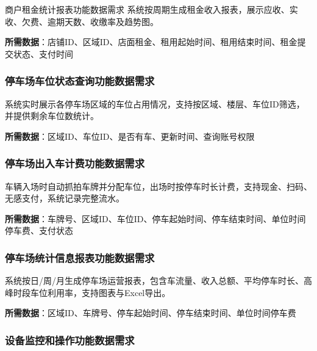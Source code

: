 \documentclass[]{article}
\begin{document}
商户租金统计报表功能数据需求
系统按周期生成租金收入报表，展示应收、实收、欠费、逾期天数、收缴率及趋势图。

\textbf{所需数据}：店铺ID、区域ID、店面租金、租用起始时间、租用结束时间、租金提交状态、支付时间

\hypertarget{ux505cux8f66ux573aux8f66ux4f4dux72b6ux6001ux67e5ux8be2ux529fux80fdux6570ux636eux9700ux6c42}{%
  \subsubsection{停车场车位状态查询功能数据需求}\label{ux505cux8f66ux573aux8f66ux4f4dux72b6ux6001ux67e5ux8be2ux529fux80fdux6570ux636eux9700ux6c42}}

系统实时展示各停车场区域的车位占用情况，支持按区域、楼层、车位ID筛选，并提供剩余车位数统计。

\textbf{所需数据}：区域ID、车位ID、是否有车、更新时间、查询账号权限

\hypertarget{ux505cux8f66ux573aux51faux5165ux8f66ux8ba1ux8d39ux529fux80fdux6570ux636eux9700ux6c42}{%
  \subsubsection{停车场出入车计费功能数据需求}\label{ux505cux8f66ux573aux51faux5165ux8f66ux8ba1ux8d39ux529fux80fdux6570ux636eux9700ux6c42}}

车辆入场时自动抓拍车牌并分配车位，出场时按停车时长计费，支持现金、扫码、无感支付，系统记录完整流水。

\textbf{所需数据}：车牌号、区域ID、车位ID、停车起始时间、停车结束时间、单位时间停车费、支付状态

\hypertarget{ux505cux8f66ux573aux7edfux8ba1ux4fe1ux606fux62a5ux8868ux529fux80fdux6570ux636eux9700ux6c42}{%
  \subsubsection{停车场统计信息报表功能数据需求}\label{ux505cux8f66ux573aux7edfux8ba1ux4fe1ux606fux62a5ux8868ux529fux80fdux6570ux636eux9700ux6c42}}

系统按日/周/月生成停车场运营报表，包含车流量、收入总额、平均停车时长、高峰时段车位利用率，支持图表与Excel导出。

\textbf{所需数据}：区域ID、车牌号、停车起始时间、停车结束时间、单位时间停车费

\hypertarget{ux8bbeux5907ux76d1ux63a7ux548cux64cdux4f5cux529fux80fdux6570ux636eux9700ux6c42}{%
  \subsubsection{设备监控和操作功能数据需求}\label{ux8bbeux5907ux76d1ux63a7ux548cux64cdux4f5cux529fux80fdux6570ux636eux9700ux6c42}}
\end{document}
